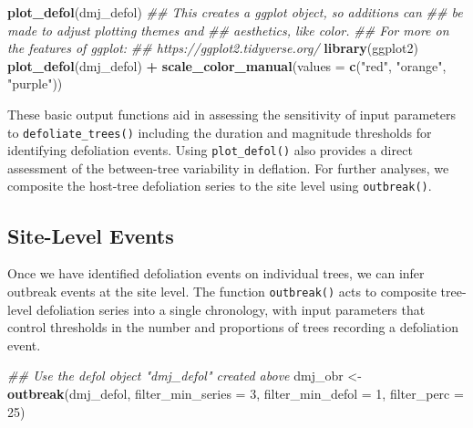 \documentclass[review]{elsarticle} %
\newenvironment{Shaded}{\begin{snugshade}}{\end{snugshade}}
\newcommand{\CommentTok}[1]{\textcolor[rgb]{0.56,0.35,0.01}{\textit{#1}}}
\newcommand{\DataTypeTok}[1]{\textcolor[rgb]{0.13,0.29,0.53}{#1}}
\newcommand{\DecValTok}[1]{\textcolor[rgb]{0.00,0.00,0.81}{#1}}
\newcommand{\KeywordTok}[1]{\textcolor[rgb]{0.13,0.29,0.53}{\textbf{#1}}}
\newcommand{\NormalTok}[1]{#1}
\newcommand{\OperatorTok}[1]{\textcolor[rgb]{0.81,0.36,0.00}{\textbf{#1}}}
\newcommand{\StringTok}[1]{\textcolor[rgb]{0.31,0.60,0.02}{#1}}
\begin{document}
\begin{Shaded}
\begin{Highlighting}[]
\KeywordTok{plot_defol}\NormalTok{(dmj_defol)}
\CommentTok{## This creates a ggplot object, so additions can }
\CommentTok{## be made to adjust plotting themes and}
\CommentTok{## aesthetics, like color.   }
\CommentTok{## For more on the features of ggplot:}
\CommentTok{## https://ggplot2.tidyverse.org/}
\KeywordTok{library}\NormalTok{(ggplot2)}
\KeywordTok{plot_defol}\NormalTok{(dmj_defol) }\OperatorTok{+}
\StringTok{  }\KeywordTok{scale_color_manual}\NormalTok{(}\DataTypeTok{values =} \KeywordTok{c}\NormalTok{(}\StringTok{"red"}\NormalTok{, }\StringTok{"orange"}\NormalTok{, }\StringTok{"purple"}\NormalTok{))}
\end{Highlighting}
\end{Shaded}

These basic output functions aid in assessing the sensitivity of input parameters to \texttt{defoliate\_trees()} including the duration and magnitude thresholds for identifying defoliation events. Using \texttt{plot\_defol()} also provides a direct assessment of the between-tree variability in deflation. For further analyses, we composite the host-tree defoliation series to the site level using \texttt{outbreak()}.

\hypertarget{site-level-events}{%
\subsection{Site-Level Events}\label{site-level-events}}

Once we have identified defoliation events on individual trees, we can infer outbreak events at the site level. The function \texttt{outbreak()} acts to composite tree-level defoliation series into a single chronology, with input parameters that control thresholds in the number and proportions of trees recording a defoliation event.

\begin{Shaded}
\begin{Highlighting}[]
\CommentTok{## Use the defol object "dmj_defol" created above}
\NormalTok{dmj_obr <-}\StringTok{ }\KeywordTok{outbreak}\NormalTok{(dmj_defol,}
                    \DataTypeTok{filter_min_series =} \DecValTok{3}\NormalTok{,}
                    \DataTypeTok{filter_min_defol =} \DecValTok{1}\NormalTok{,}
                    \DataTypeTok{filter_perc =} \DecValTok{25}\NormalTok{)}
\end{Highlighting}
\end{Shaded}
\end{document}
